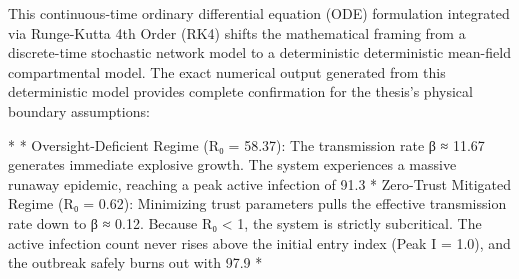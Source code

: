 This continuous-time ordinary differential equation (ODE) formulation integrated via Runge-Kutta 4th Order (RK4) shifts the mathematical framing from a discrete-time stochastic network model to a deterministic deterministic mean-field compartmental model.
The exact numerical output generated from this deterministic model provides complete confirmation for the thesis's physical boundary assumptions:

* 
* Oversight-Deficient Regime (R₀ = 58.37): The transmission rate β ≈ 11.67 generates immediate explosive growth. The system experiences a massive runaway epidemic, reaching a peak active infection of 91.3%
* Zero-Trust Mitigated Regime (R₀ = 0.62): Minimizing trust parameters pulls the effective transmission rate down to β ≈ 0.12. Because R₀ < 1, the system is strictly subcritical. The active infection count never rises above the initial entry index (Peak I = 1.0), and the outbreak safely burns out with 97.9%
* 


